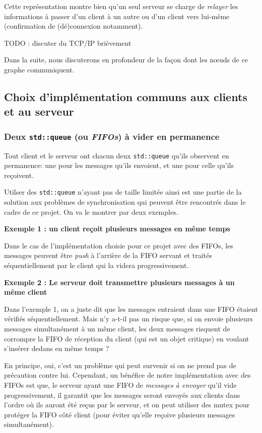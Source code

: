 \documentclass{article}
\begin{document}
Cette représentation montre bien qu'un seul serveur se charge de \textit{relayer} les informations à passer d'un client à un autre ou d'un client vers lui-même (confirmation de (dé)connexion notamment). 

TODO : discuter du TCP/IP brièvement

Dans la suite, nous discuterons en profondeur de la façon dont les nœuds de ce graphe communiquent.

\subsection{Choix d'implémentation communs aux clients et au serveur}

\subsubsection{Deux \texttt{std::queue} (ou \textit{FIFOs}) à vider en permanence}
Tout client et le serveur ont chacun deux \texttt{std::queue} qu'ils observent en permanence: une pour les messages qu'ils envoient, et une pour celle qu'ils reçoivent. 

Utilser des \texttt{std::queue} n'ayant pas de taille limitée ainsi est une partie de la solution aux problèmes de synchronisation qui peuvent être rencontrés dans le cadre de ce projet. On va le montrer par deux exemples.


\textbf{Exemple 1 : un client reçoit plusieurs messages en même temps}

Dans le cas de l'implémentation choisie pour ce projet avec des FIFOs, les messages peuvent être \textit{push} à l'arrière de la FIFO servant et traités séquentiellement par le client qui la videra progressivement.


\textbf{Exemple 2 : Le serveur doit transmettre plusieurs messages à un même client}

Dans l'exemple 1, on a juste dit que les messages entraient dans une FIFO étaient vérifiés séquentiellement. Mais n'y a-t-il pas un risque que, si on envoie plusieurs messages simultanément à un même client, les deux messages risquent de corrompre la FIFO de réception du client (qui est un objet critique) en voulant s'insérer dedans en même temps ?


En principe, oui, c'est un problème qui peut survenir si on ne prend pas de précaution contre lui. Cependant, un bénéfice de notre implémentation avec des FIFOs est que, le serveur ayant une FIFO de \textit{messages à envoyer} qu'il vide progressivement, il garantit que les messages seront envoyés aux clients dans l'ordre où ils auront été reçus par le serveur, et on peut utiliser des mutex pour protéger la FIFO côté client (pour éviter qu'elle reçoive plusieurs messages simultanément).
\end{document}
